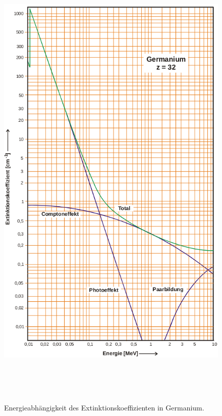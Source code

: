  \begin{figure}
   \centering
   \includegraphics[height=23cm]{content/Germanium.png}
   \caption{Energieabhängigkeit des Extinktionskoeffizienten in Germanium.\cite{V18}}
   \label{fig:Germanium}
 \end{figure}

